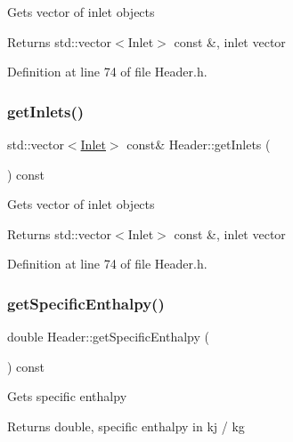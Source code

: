 Gets vector of inlet objects \begin{DoxyReturn}{Returns}
std\+::vector$<$\+Inlet$>$ const \&, inlet vector 
\end{DoxyReturn}


Definition at line 74 of file Header.\+h.

\mbox{\label{class_header_a625d7317488c88c949acd05c72a7c54a}} 
\subsubsection{\texorpdfstring{get\+Inlets()}{getInlets()}\hspace{0.1cm}{\footnotesize\ttfamily [3/3]}}
{\footnotesize\ttfamily std\+::vector$<$\hyperlink{class_inlet}{Inlet}$>$ const\& Header\+::get\+Inlets (\begin{DoxyParamCaption}{ }\end{DoxyParamCaption}) const\hspace{0.3cm}{\ttfamily [inline]}}

Gets vector of inlet objects \begin{DoxyReturn}{Returns}
std\+::vector$<$\+Inlet$>$ const \&, inlet vector 
\end{DoxyReturn}


Definition at line 74 of file Header.\+h.

\mbox{\label{class_header_af913dbf132f8cb3af6e6b374813acd93}} 
\subsubsection{\texorpdfstring{get\+Specific\+Enthalpy()}{getSpecificEnthalpy()}\hspace{0.1cm}{\footnotesize\ttfamily [1/3]}}
{\footnotesize\ttfamily double Header\+::get\+Specific\+Enthalpy (\begin{DoxyParamCaption}{ }\end{DoxyParamCaption}) const\hspace{0.3cm}{\ttfamily [inline]}}

Gets specific enthalpy \begin{DoxyReturn}{Returns}
double, specific enthalpy in kj / kg 
\end{DoxyReturn}



